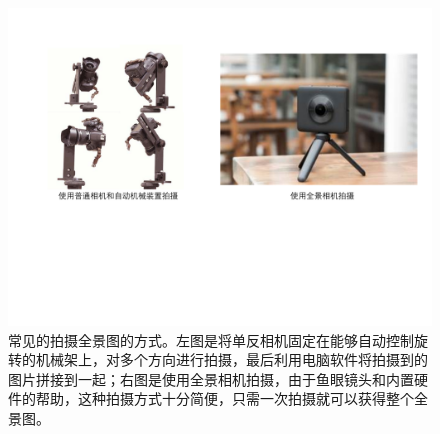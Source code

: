 \begin{figure}[!htbp]
    \centering
    \includegraphics[width=1.0\textwidth]{Img/capture-panorama.pdf}
    \caption[拍摄全景图的示例]
    {常见的拍摄全景图的方式。左图是将单反相机固定在能够自动控制旋转的机械架上，对多个方向进行拍摄，最后利用电脑软件将拍摄到的图片拼接到一起；右图是使用全景相机拍摄，由于鱼眼镜头和内置硬件的帮助，这种拍摄方式十分简便，只需一次拍摄就可以获得整个全景图。}
    \label{fig:capture-panorama}
\end{figure}